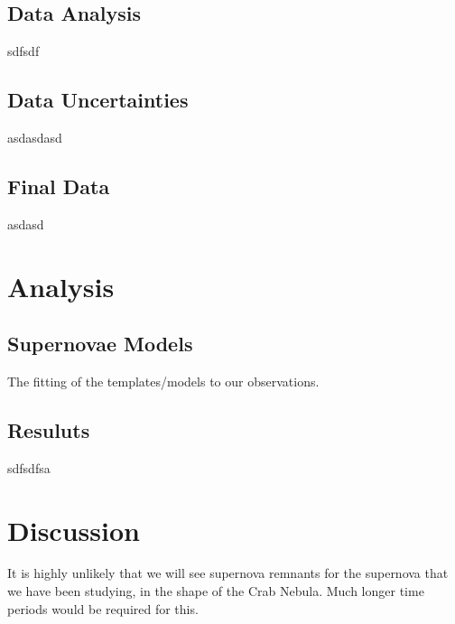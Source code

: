 \documentclass[twocolumn]{revtex4}
\begin{document}
\vspace{-3ex}
\subsection{Data Analysis}
\vspace{-2ex}

sdfsdf

\vspace{-3ex}
\subsection{Data Uncertainties}
\vspace{-2ex}

asdasdasd

\vspace{-3ex}
\subsection{Final Data}
\vspace{-2ex}

asdasd

\vspace{-3ex}
\section{Analysis}
\vspace{-2ex}
\subsection{Supernovae Models}
\vspace{-2ex}

The fitting of the templates/models to our observations.

\vspace{-3ex}
\subsection{Resuluts}
\vspace{-2ex}

sdfsdfsa

\vspace{-3ex}
\section{Discussion}
\vspace{-2ex}

It is highly unlikely that we will see supernova remnants for the supernova that we have been studying, in the shape of the Crab Nebula. Much longer time periods would be required for this. 
\end{document}
